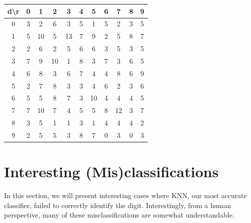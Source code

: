 \documentclass[10pt]{extarticle}
\begin{document}
\begin{minipage}{.4\textwidth}
\begin{tabular}{c | c c c c c c c c c c}
 d\textbackslash r&0&1&2&3&4&5&6&7&8&9\\ \hline
 0&3&2&6&3&5&1&5&2&3&5\\
 1&5&10&5&13&7&9&2&5&8&7\\
 2&2&6&2&5&6&6&3&5&3&5\\
 3&7&9&10&1&8&3&7&3&6&5\\
 4&6&8&3&6&7&4&4&8&6&9\\
 5&2&7&8&3&3&4&6&2&3&6\\
 6&5&5&8&7&3&10&4&4&4&5\\
 7&7&10&7&4&5&5&8&12&3&7\\
 8&3&5&1&1&3&1&4&4&4&2\\
 9&2&5&5&3&8&7&0&3&0&3
 \end{tabular}
\end{minipage}

\section {Interesting (Mis)classifications}

In this section, we will present interesting cases where KNN, our most accurate classifier, failed to correctly identify the digit. Interestingly, from a human perspective, many of these misclassifications are somewhat understandable.
\end{document}
